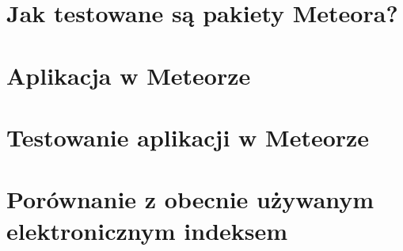\documentclass[brudnopis]{xmgr}
\begin{document}


      
\chapter{Jak testowane są pakiety Meteora?}

    

   

\chapter{Aplikacja w Meteorze}

\chapter{Testowanie aplikacji w Meteorze}

\chapter{Porównanie z obecnie używanym elektronicznym indeksem}

\summary


\end{document}
